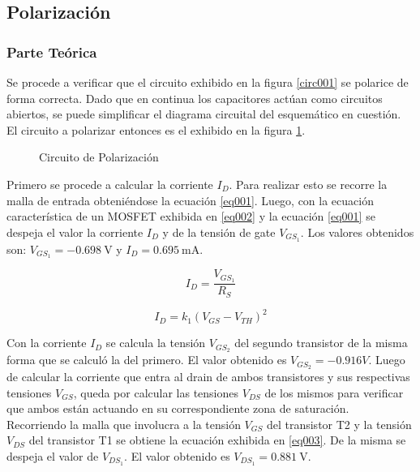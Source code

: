 \documentclass[a4paper,10pt]{article}
\begin{document}
		\subsection{Polarización}

			\subsubsection{Parte Teórica}
				Se procede a verificar que el circuito exhibido en la figura \ref{circ001} se polarice de forma correcta. Dado que en continua los capacitores 
				actúan como circuitos abiertos, se puede simplificar el diagrama circuital del esquemático en cuestión. El circuito a polarizar entonces es el 
				exhibido en la figura \ref{circ002}. \\

				\begin{figure}[!htp]
					\centering
			 		
	     		\caption{Circuito de Polarización} \label{circ002}
		 		\end{figure}

				\indent Primero se procede a calcular la corriente $I_{D}$. Para realizar esto se recorre la malla de entrada obteniéndose la ecuación \ref{eq001}.
				Luego, con la ecuación característica de un MOSFET exhibida en \ref{eq002} y la ecuación \ref{eq001} se despeja el valor la corriente $I_D$ y de la 
				tensión de gate $V_{GS_{1}}$. Los valores obtenidos son:  $V_{GS_1} = -0.698~\text{V}$ y $I_D = 0.695~\text{mA}$.

				\begin{equation}
					I_D = \frac{V_{GS_1}}{R_S} \label{eq001}
				\end{equation}

				\begin{equation}
					I_D = k_1 (V_{GS} - V_{TH})^2 \label{eq002}
				\end{equation}

				Con la corriente $I_D$ se calcula la tensión $V_{GS_2}$ del segundo transistor de la misma forma que se calculó la del primero. El valor obtenido 
				es $V_{GS_2} = -0.916 V$. Luego de calcular la corriente que entra al drain de ambos transistores y sus respectivas tensiones $V_{GS}$, queda por 
				calcular las tensiones $V_{DS}$ de los mismos para verificar que ambos están actuando en su correspondiente zona de saturación. \\
				\indent Recorriendo la malla que involucra a la tensión $V_{GS}$ del transistor T2 y la tensión $V_{DS}$ del transistor T1 se obtiene la ecuación
				exhibida en \ref{eq003}. De la misma se despeja el valor de $V_{DS_1}$. El valor obtenido es $V_{DS_1} = 0.881~\text{V}$.
\end{document}
